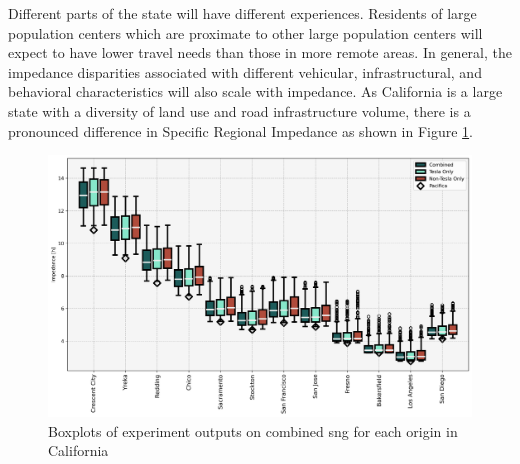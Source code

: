 \documentclass[11pt]{article}
\begin{document}
\begin{multicols}{2}
Different parts of the state will have different experiences. Residents of large population centers which are proximate to other large population centers will expect to have lower travel needs than those in more remote areas. In general, the impedance disparities associated with different vehicular, infrastructural, and behavioral characteristics will also scale with impedance. As California is a large state with a diversity of land use and road infrastructure volume, there is a pronounced difference in Specific Regional Impedance as shown in Figure \ref{fig:networks_boxplots_locations}.

\end{multicols}

\begin{figure}[H]
	\centering
	\includegraphics[width = \linewidth]{figs/Networks_Boxplots_Weighted_Specific_Impedance_2.png}
	\caption{Boxplots of experiment outputs on combined \gls{sng} for each origin in California}
	\label{fig:networks_boxplots_locations}
\end{figure}
\end{document}
